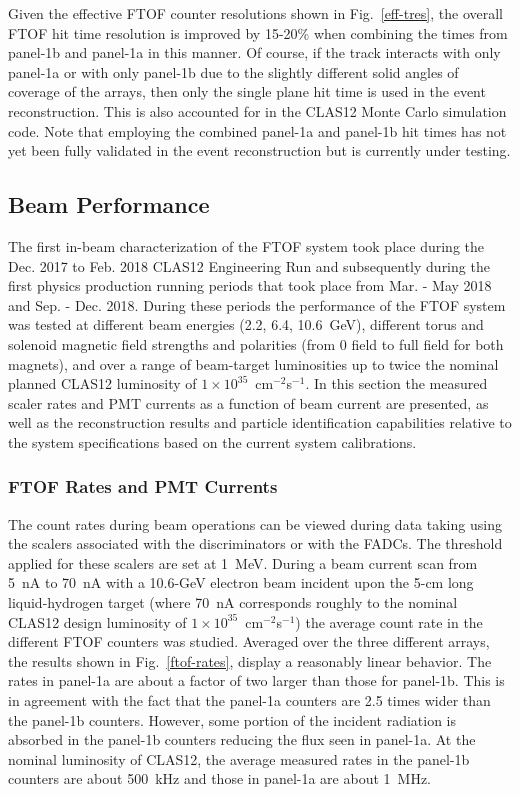 \documentclass[final,3p,twocolumn]{elsarticle}
\begin{document}
Given the effective FTOF counter resolutions shown in Fig.~\ref{eff-tres}, the overall FTOF hit
time resolution is improved by 15-20\% when combining the times from panel-1b and panel-1a in this
manner. Of course, if the track interacts with only panel-1a or with only panel-1b due to the slightly
different solid angles of coverage of the arrays, then only the single plane hit time is used in the
event reconstruction. This is also accounted for in the CLAS12 Monte Carlo simulation code. Note that
employing the combined panel-1a and panel-1b hit times has not yet been fully validated in the event
reconstruction but is currently under testing.
  
\subsection{Beam Performance}  
\label{sec:beam}

The first in-beam characterization of the FTOF system took place during the Dec. 2017 to Feb. 2018
CLAS12 Engineering Run and subsequently during the first physics production running periods that took
place from Mar. - May 2018 and Sep. - Dec. 2018. During these periods the performance of the FTOF
system was tested at different beam energies (2.2, 6.4, 10.6~GeV), different torus and solenoid magnetic
field strengths and polarities (from 0 field to full field for both magnets), and over a range of beam-target
luminosities up to twice the nominal planned CLAS12 luminosity of $1 \times 10^{35}$~cm$^{-2}$s$^{-1}$.
In this section the measured scaler rates and PMT currents as a function of beam current are presented,
as well as the reconstruction results and particle identification capabilities relative to the system
specifications based on the current system calibrations.

\subsubsection{FTOF Rates and PMT Currents}

The count rates during beam operations can be viewed during data taking using the scalers associated
with the discriminators or with the FADCs. The threshold applied for these scalers are set at 1~MeV.
During a beam current scan from 5~nA to 70~nA with a 10.6-GeV electron beam incident upon the 5-cm long
liquid-hydrogen target (where 70~nA corresponds roughly to the nominal CLAS12 design luminosity of
$1 \times 10^{35}$~cm$^{-2}$s$^{-1}$) the average count rate in the different FTOF counters was studied.
Averaged over the three different arrays, the results shown in Fig.~\ref{ftof-rates}, display a reasonably
linear behavior. The rates in panel-1a are about a factor of two larger than those for panel-1b. This is in
agreement with the fact that the panel-1a counters are 2.5 times wider than the panel-1b counters. However,
some portion of the incident radiation is absorbed in the panel-1b counters reducing the flux seen in panel-1a.
At the nominal luminosity of CLAS12, the average measured rates in the panel-1b counters are about 500~kHz
and those in panel-1a are about 1~MHz.
\end{document}

